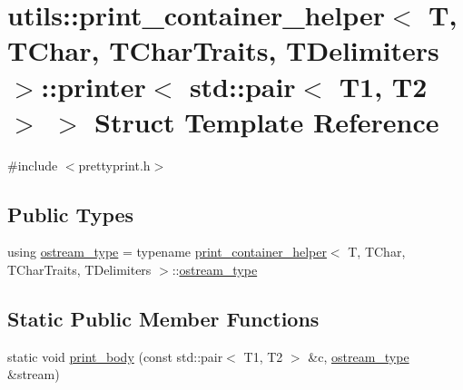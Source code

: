 \hypertarget{structutils_1_1print__container__helper_1_1printer_3_01std_1_1pair_3_01_t1_00_01_t2_01_4_01_4}{}\section{utils\+::print\+\_\+container\+\_\+helper$<$ T, T\+Char, T\+Char\+Traits, T\+Delimiters $>$\+::printer$<$ std\+::pair$<$ T1, T2 $>$ $>$ Struct Template Reference}
\label{structutils_1_1print__container__helper_1_1printer_3_01std_1_1pair_3_01_t1_00_01_t2_01_4_01_4}


{\ttfamily \#include $<$prettyprint.\+h$>$}

\subsection*{Public Types}
\begin{DoxyCompactItemize}
\item 
using \mbox{\hyperlink{structutils_1_1print__container__helper_1_1printer_3_01std_1_1pair_3_01_t1_00_01_t2_01_4_01_4_a170b667e3c3c6f0dae4c03c207517bbd}{ostream\+\_\+type}} = typename \mbox{\hyperlink{structutils_1_1print__container__helper}{print\+\_\+container\+\_\+helper}}$<$ T, T\+Char, T\+Char\+Traits, T\+Delimiters $>$\+::\mbox{\hyperlink{structutils_1_1print__container__helper_1_1printer_3_01std_1_1pair_3_01_t1_00_01_t2_01_4_01_4_a170b667e3c3c6f0dae4c03c207517bbd}{ostream\+\_\+type}}
\end{DoxyCompactItemize}
\subsection*{Static Public Member Functions}
\begin{DoxyCompactItemize}
\item 
static void \mbox{\hyperlink{structutils_1_1print__container__helper_1_1printer_3_01std_1_1pair_3_01_t1_00_01_t2_01_4_01_4_a5334428662f5371f3e71049005cc8860}{print\+\_\+body}} (const std\+::pair$<$ T1, T2 $>$ \&c, \mbox{\hyperlink{structutils_1_1print__container__helper_1_1printer_3_01std_1_1pair_3_01_t1_00_01_t2_01_4_01_4_a170b667e3c3c6f0dae4c03c207517bbd}{ostream\+\_\+type}} \&stream)
\end{DoxyCompactItemize}


